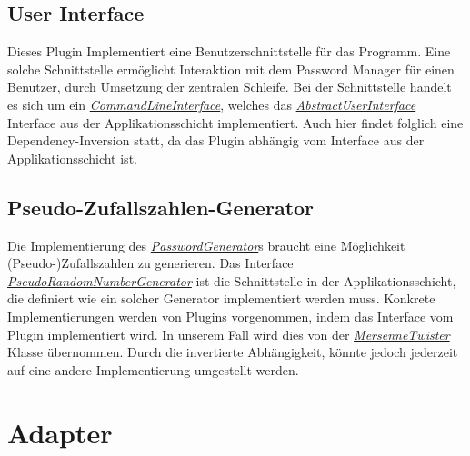 \subsection{User Interface}

Dieses Plugin Implementiert eine Benutzerschnittstelle für das Programm. Eine solche Schnittstelle ermöglicht Interaktion mit dem Password Manager für einen Benutzer, durch Umsetzung der zentralen Schleife. Bei der Schnittstelle handelt es sich um ein \href{https://github.com/moorts/Morik/blob/main/src/plugins/ui/CommandLineInterface.h}{\textit{CommandLineInterface}}, welches das \href{https://github.com/moorts/Morik/blob/main/src/application/AbstractUserInterface.h}{\textit{AbstractUserInterface}} Interface aus der Applikationsschicht implementiert. Auch hier findet folglich eine Dependency-Inversion statt, da das Plugin abhängig vom Interface aus der Applikationsschicht ist.

\subsection{Pseudo-Zufallszahlen-Generator}

Die Implementierung des \href{https://github.com/moorts/Morik/blob/main/src/application/PasswordGenerator.h}{\textit{PasswordGenerator}}s braucht eine Möglichkeit (Pseudo-)Zufallszahlen zu generieren. Das Interface \href{https://github.com/moorts/Morik/blob/main/src/application/PseudoRandomNumberGenerator.h}{\textit{PseudoRandomNumberGenerator}} ist die Schnittstelle in der Applikationsschicht, die definiert wie ein solcher Generator implementiert werden muss. Konkrete Implementierungen werden von Plugins vorgenommen, indem das Interface vom Plugin implementiert wird. In unserem Fall wird dies von der \href{https://github.com/moorts/Morik/blob/main/src/plugins/prng/MersenneTwister.h}{\textit{MersenneTwister}} Klasse übernommen. Durch die invertierte Abhängigkeit, könnte jedoch jederzeit auf eine andere Implementierung umgestellt werden.

\section{Adapter}
